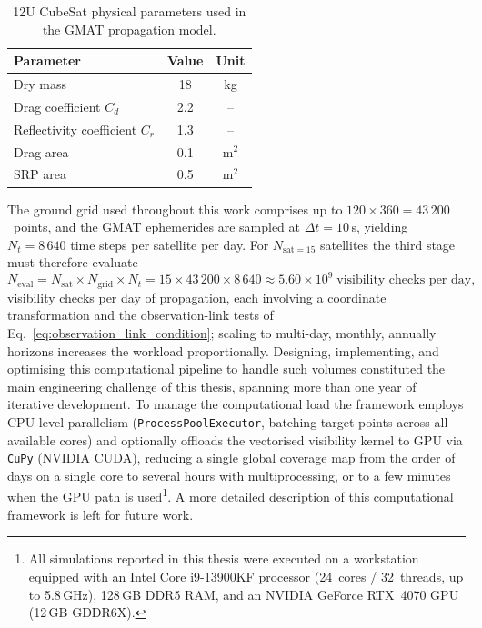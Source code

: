 \begin{table}[H]
    \centering
    \caption{\footnotesize{12U CubeSat physical parameters used in the GMAT propagation model.}}
    \label{tab:cubesat_params}
    \footnotesize
    \begin{tabular}{lcc}
        \hline
        \textbf{Parameter} & \textbf{Value} & \textbf{Unit} \\
        \hline
        Dry mass              & 18   & kg          \\
        Drag coefficient $C_d$ & 2.2  & --          \\
        Reflectivity coefficient $C_r$ & 1.3  & --  \\
        Drag area             & 0.1  & m$^{2}$     \\
        SRP area              & 0.5  & m$^{2}$     \\
        \hline
    \end{tabular}
\end{table}

The ground grid used throughout this work comprises up to $120 \times 360 = 43\,200$~points, and the GMAT ephemerides are sampled at $\Delta t = 10$\,s, yielding $N_t = 8\,640$ time steps per satellite per day.  For $N_{\mathrm{sat}=15}$ satellites the third stage must therefore evaluate
\begin{equation}
    N_{\mathrm{eval}} = N_{\mathrm{sat}} \times N_{\mathrm{grid}} \times N_t = 15 \times 43\,200 \times 8\,640 \approx 5.60 \times 10^{9} \;\text{visibility checks per day,}
    \label{eq:visibility_eval_count}
\end{equation}
visibility checks per day of propagation, each involving a coordinate transformation and the observation-link tests of Eq.~\eqref{eq:observation_link_condition}; scaling to multi-day,  monthly, annually horizons increases the workload proportionally.  Designing, implementing, and optimising this computational pipeline to handle such volumes constituted the main engineering challenge of this thesis, spanning more than one year of iterative development.  To manage the computational load the framework employs CPU-level parallelism (\texttt{ProcessPoolExecutor}, batching target points across all available cores) and optionally offloads the vectorised visibility kernel to GPU via \texttt{CuPy} (NVIDIA CUDA), reducing a single global coverage map from the order of days on a single core to several hours with multiprocessing, or to a few minutes when the GPU path is used\footnote{All simulations reported in this thesis were executed on a workstation equipped with an Intel Core i9-13900KF processor (24~cores / 32~threads, up to 5.8\,GHz), 128\,GB DDR5 RAM, and an NVIDIA GeForce RTX~4070 GPU (12\,GB GDDR6X).}.  A more detailed description of this computational framework is left for future work.




